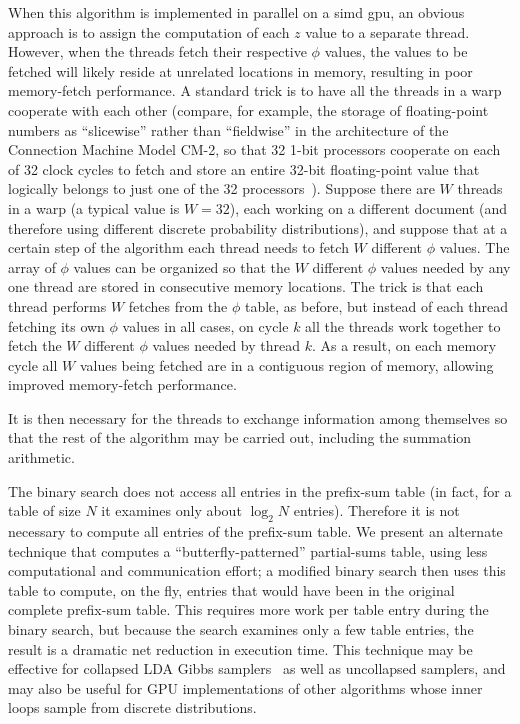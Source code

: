 \documentclass[10pt,nohyperref]{sigplanconf}
\begin{document}
When this algorithm is implemented in parallel on a {\sc simd} {\sc gpu}, an obvious approach is to assign the computation of each $z$ value to a separate thread.
However, when the threads fetch their respective $\phi$ values, the values to be fetched will likely reside at unrelated locations in memory, resulting in poor memory-fetch performance.  A standard trick is to have all the threads in a warp cooperate with each other (compare, for example, the storage of floating-point numbers as ``slicewise'' rather than ``fieldwise'' in the architecture of the Connection Machine Model CM-2, so that 32 1-bit processors cooperate on each of 32 clock cycles to fetch and store an entire 32-bit floating-point value that logically belongs to just one of the 32 processors~\cite{Johnsson-1989}).  Suppose there are $W$ threads in a warp (a typical value is $W=32$), each working on a different document (and therefore using different discrete probability distributions), and suppose that at a certain step of the algorithm each thread needs to fetch $W$ different $\phi$ values.  The array of $\phi$ values can be organized so that the $W$ different $\phi$ values needed by any one thread are stored in consecutive memory locations.  The trick is that each thread performs $W$ fetches from the $\phi$ table, as before, but instead of each thread fetching its own $\phi$ values in all cases, on cycle $k$ all the threads work together to fetch the $W$ different $\phi$ values needed by thread $k$.  As a result, on each memory cycle all $W$ values being fetched are in a contiguous region of memory,
allowing improved memory-fetch performance.

It is then necessary for the threads to exchange information among themselves so that the rest of the algorithm may be carried out, including the summation arithmetic.

The binary search does not access all entries in the prefix-sum table (in fact, for a table of size $N$ it examines only about $\log_2 N$ entries).  Therefore it is not necessary to compute all entries of the prefix-sum table.  We present
an alternate technique that computes
a ``butterfly-patterned'' partial-sums table, using less computational and communication effort; a modified binary search then uses this table to compute, on the fly, entries that would have been in the original complete prefix-sum table.  This requires more work per table entry during the binary search, but because the search examines only a few table entries, the result is a dramatic net reduction in execution time.  This technique may be effective for collapsed LDA Gibbs samplers~\cite{yan_parallel_2009,lu_accelerating_2013,Augur}
as well as uncollapsed samplers, and may also be useful for GPU implementations of other algorithms \cite{zhao_same_2014}
whose inner loops sample from discrete distributions.
\end{document}
